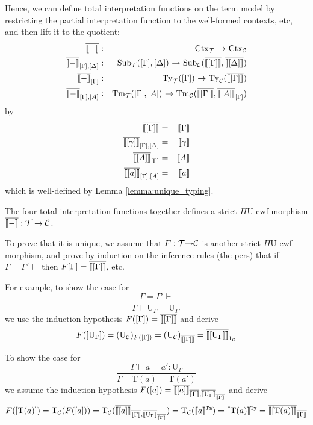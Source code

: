 \documentclass{lmcs}
\def\UU{\mathrm{U}}
\def\Ta{\mathrm{T}}
\newcommand{\intTyU}[1]{\llbracket #1 \rrbracket^\RawTy}
\newcommand{\intTmU}[1]{\llbracket #1 \rrbracket^\RawTm}
\begin{document}
%

Hence, we can define total interpretation functions on the term model by restricting the partial 
interpretation function to the well-formed contexts, etc, and then lift it to the quotient:
\begin{eqnarray*}
\iniCtx{-} &:& \Ctx_\T\ \arrow\ \Ctx_\C\\
\iniSub{[\Gamma]}{[\Delta]}{-} &:&
 \Sub_\T([\Gamma],{[\Delta]}) \ \arrow \
 \Sub_\C(\iniCtx{[\Gamma]},{\iniCtx{[\Delta]}})\\
\iniTy{[\Gamma]}{-} &:& \Ty_\T([\Gamma])\ \arrow\ \Ty_\C(\iniCtx{[\Gamma]})\\
\iniTm{[\Gamma]}{[A]}{-} &:& \Tm_\T([\Gamma],[A])\ \arrow\ \Tm_\C(\iniCtx{[\Gamma]},\iniTy{[\Gamma]}{[A]})
\end{eqnarray*}
by
\begin{eqnarray*}
\iniCtx{[\Gamma]} &=& \inte{\Gamma}\\
\iniSub{[\Gamma]}{[\Delta]}{[\gamma]} &=& \inte{\gamma}\\
\iniTy{[\Gamma]}{[A]} &=& \inte{A}\\
\iniTm{[\Gamma]}{[A]}{[a]} &=& \inte{a}
\end{eqnarray*}
which is well-defined by Lemma \ref{lemma:unique_typing}.

The four total interpretation functions together defines a strict $\Pi\UU$-cwf
morphism $\iniCtx{-} :\T  \rightarrow  \C$.

To prove that it is unique, we assume that $F : \T \arrow \C$ is another strict $\Pi\UU$-cwf
morphism, and prove by induction on the inference rules (the pers) that if $\Gamma = \Gamma' \vdash$
then $F[\Gamma] = \iniCtx{[\Gamma]}$, etc.  

For example, to show the case for 
$$
\frac{\Gamma = \Gamma' \vdash}{\Gamma \vdash \UU_\Gamma = \UU_{\Gamma'}}
$$
we use the induction hypothesis $F([\Gamma]) = \iniCtx{[\Gamma]}$ and derive 
$$
F([\UU_\Gamma]) = (\UU_\C)_{F([\Gamma])} = (\UU_\C)_{\iniCtx{[\Gamma]}} = \iniTy{1_\C}{[\UU_\Gamma]}
$$

To show the case for 
$$
\frac{\Gamma \vdash a = a' : \UU_\Gamma}
{\Gamma \vdash \Ta(a) = \Ta(a' )}
$$
we assume the induction hypothesis 
 $F([a]) = \iniTm{\iniCtx{\Gamma}}{\iniTy{\iniCtx{\Gamma}}{\UU_\Gamma}}{[a]}$
and derive
$$
F([\Ta(a)]) = \Ta_\C(F([a])) = \Ta_\C(\iniTm{\iniCtx{\Gamma}}{\iniTy{\iniCtx{\Gamma}}{\UU_\Gamma}}{[a]}) = \Ta_\C(\intTmU{a}) = \intTyU{\Ta(a)} = \iniTy{\iniCtx{\Gamma}}{[\Ta(a)]}
$$
\end{document}
